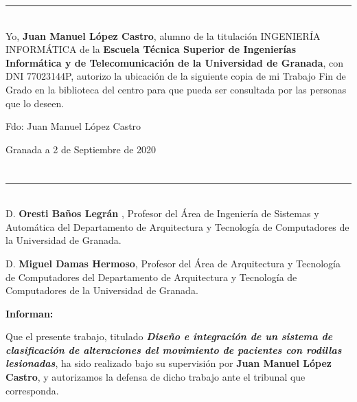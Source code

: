 \noindent\rule[-1ex]{\textwidth}{2pt}\\[4.5ex]

Yo, \textbf{Juan Manuel López Castro}, alumno de la titulación INGENIERÍA INFORMÁTICA de la \textbf{Escuela Técnica Superior
de Ingenierías Informática y de Telecomunicación de la Universidad de Granada}, con DNI 77023144P, autorizo la
ubicación de la siguiente copia de mi Trabajo Fin de Grado en la biblioteca del centro para que pueda ser
consultada por las personas que lo deseen.

\vspace{6cm}

\noindent Fdo: Juan Manuel López Castro

\vspace{2cm}

\begin{flushright}
Granada a 2 de Septiembre de 2020
\end{flushright}


\chapter*{}
\thispagestyle{empty}

\noindent\rule[-1ex]{\textwidth}{2pt}\\[4.5ex]

D. \textbf{Oresti Baños Legrán }, Profesor del Área de Ingeniería de Sistemas y Automática del Departamento de Arquitectura y Tecnología de Computadores de la Universidad de Granada.

\vspace{0.3cm}

D. \textbf{Miguel Damas Hermoso}, Profesor del Área de Arquitectura y Tecnología de Computadores del Departamento de Arquitectura y Tecnología de Computadores de la Universidad de Granada.


\vspace{0.3cm}

\textbf{Informan:}

\vspace{0.3cm}

Que el presente trabajo, titulado \textit{\textbf{Diseño e integración de un sistema de clasificación de alteraciones del movimiento de pacientes con rodillas lesionadas}},
ha sido realizado bajo su supervisión por \textbf{Juan Manuel López Castro}, y autorizamos la defensa de dicho trabajo ante el tribunal
que corresponda.

\vspace{0.3cm}

